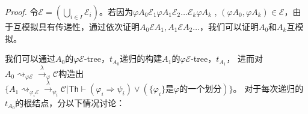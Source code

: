 \textit{Proof.} 令$\mathcal{E}=(\bigcup_{i\in I}\mathcal{E}_i)$。若因为$\varphi A_0\mathcal{E}_1 \varphi A_1 \mathcal{E}_2 \dots \mathcal{E}_k \varphi A_k$ ,
$(\varphi A_0, \varphi A_k)\in \mathcal{E}$，由于互模拟具有传递性，通过依次证明$A_0\mathcal{E}A_1, A_1\mathcal{E}A_2 \dots$，我们可以证明$A_0$和$A_k$互模拟。

我们可以通过$A_0$的$\varphi\mathcal{E}$-tree，$t_{A_0}$递归的构建$A_1$的$\varphi\mathcal{E}$-tree，$t_{A_1}$，
进而对$A_0\rightsquigarrow_{\varphi\mathcal{E}}\stackrel{\lambda}{\rightarrow}_{\varphi}\mathcal{C}$构造出$\{A_1\rightsquigarrow_{\varphi_i\mathcal{E}}\stackrel{\lambda}{\rightarrow}_{\psi_i} \mathcal{C}|\mathsf{Th}\vdash (\varphi_i\Rightarrow\psi_i)\vee (\textrm{$\{\varphi_i\}$是$\varphi$的一个划分})\}$。
对于每次递归的$t_{A_0}$的根结点，分以下情况讨论：

